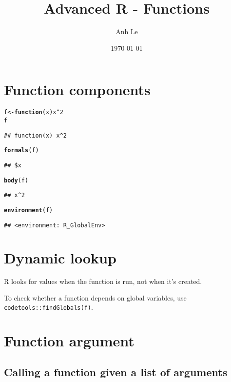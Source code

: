 \documentclass{article}\usepackage[]{graphicx}\usepackage[]{color}
\title{Advanced R - Functions}
\date{\today}
\author{Anh Le}
\makeatletter
\newcommand{\hlnum}[1]{\textcolor[rgb]{0.686,0.059,0.569}{#1}}%
\newcommand{\hlopt}[1]{\textcolor[rgb]{0,0,0}{#1}}%
\newcommand{\hlstd}[1]{\textcolor[rgb]{0.345,0.345,0.345}{#1}}%
\newcommand{\hlkwa}[1]{\textcolor[rgb]{0.161,0.373,0.58}{\textbf{#1}}}%
\newcommand{\hlkwb}[1]{\textcolor[rgb]{0.69,0.353,0.396}{#1}}%
\newcommand{\hlkwc}[1]{\textcolor[rgb]{0.333,0.667,0.333}{#1}}%
\newcommand{\hlkwd}[1]{\textcolor[rgb]{0.737,0.353,0.396}{\textbf{#1}}}%
\newenvironment{kframe}{%
 \def\at@end@of@kframe{}%
 \ifinner\ifhmode%
  \def\at@end@of@kframe{\end{minipage}}%
  \begin{minipage}{\columnwidth}%
 \fi\fi%
 \def\FrameCommand##1{\hskip\@totalleftmargin \hskip-\fboxsep
 \colorbox{shadecolor}{##1}\hskip-\fboxsep
     \hskip-\linewidth \hskip-\@totalleftmargin \hskip\columnwidth}%
 \MakeFramed {\advance\hsize-\width
   \@totalleftmargin\z@ \linewidth\hsize
   \@setminipage}}%
 {\par\unskip\endMakeFramed%
 \at@end@of@kframe}
\newenvironment{knitrout}{}{} %
\makeatother
\begin{document}
\maketitle

\section{Function components}

\begin{knitrout}
\color{fgcolor}\begin{kframe}
\begin{alltt}
\hlstd{f} \hlkwb{<-} \hlkwa{function}\hlstd{(}\hlkwc{x}\hlstd{) x}\hlopt{^}\hlnum{2}
\hlstd{f}
\end{alltt}
\begin{verbatim}
## function(x) x^2
\end{verbatim}
\begin{alltt}
\hlkwd{formals}\hlstd{(f)}
\end{alltt}
\begin{verbatim}
## $x
\end{verbatim}
\begin{alltt}
\hlkwd{body}\hlstd{(f)}
\end{alltt}
\begin{verbatim}
## x^2
\end{verbatim}
\begin{alltt}
\hlkwd{environment}\hlstd{(f)}
\end{alltt}
\begin{verbatim}
## <environment: R_GlobalEnv>
\end{verbatim}
\end{kframe}
\end{knitrout}

\section{Dynamic lookup}

R looks for values when the function is run, not when it's created.

To check whether a function depends on global variables, use \verb`codetools::findGlobals(f)`.
\section{Function argument}

\subsection{Calling a function given a list of arguments}
\end{document}
